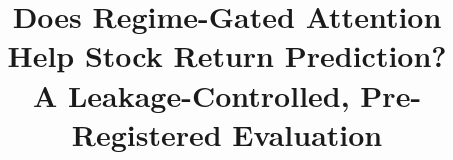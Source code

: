 \documentclass[conference]{IEEEtran}
\begin{document}
\title{Does Regime-Gated Attention Help Stock Return Prediction?\\A Leakage-Controlled, Pre-Registered Evaluation}
\author{
}
\maketitle




\end{document}
